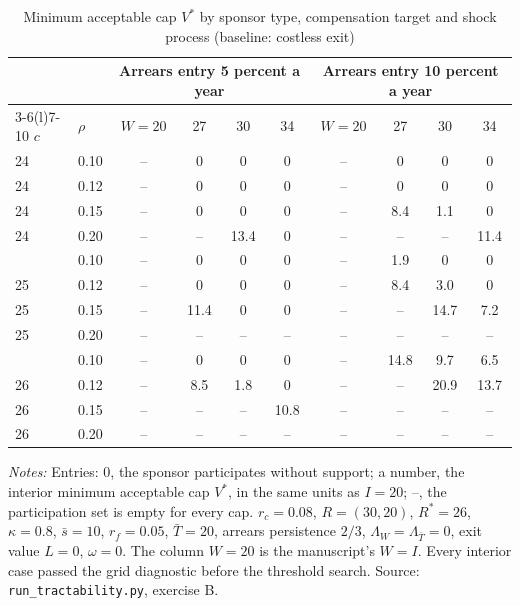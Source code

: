 \begin{table}[htbp]\centering\small
\caption{Minimum acceptable cap $V^*$ by sponsor type, compensation target and shock process (baseline: costless exit)}\label{tab:c1B}
\begin{threeparttable}\begin{tabular}{llcccccccc}\toprule
 & & \multicolumn{4}{c}{Arrears entry 5 percent a year} & \multicolumn{4}{c}{Arrears entry 10 percent a year}\\\cmidrule(lr){3-6}\cmidrule(l){7-10}
$c$ & $\rho$ & $W{=}20$ & 27 & 30 & 34 & $W{=}20$ & 27 & 30 & 34\\\midrule
24 & 0.10 & -- & 0 & 0 & 0 & -- & 0 & 0 & 0\\
24 & 0.12 & -- & 0 & 0 & 0 & -- & 0 & 0 & 0\\
24 & 0.15 & -- & 0 & 0 & 0 & -- & 8.4 & 1.1 & 0\\
24 & 0.20 & -- & -- & 13.4 & 0 & -- & -- & -- & 11.4\\
\addlinespace
25 & 0.10 & -- & 0 & 0 & 0 & -- & 1.9 & 0 & 0\\
25 & 0.12 & -- & 0 & 0 & 0 & -- & 8.4 & 3.0 & 0\\
25 & 0.15 & -- & 11.4 & 0 & 0 & -- & -- & 14.7 & 7.2\\
25 & 0.20 & -- & -- & -- & -- & -- & -- & -- & --\\
\addlinespace
26 & 0.10 & -- & 0 & 0 & 0 & -- & 14.8 & 9.7 & 6.5\\
26 & 0.12 & -- & 8.5 & 1.8 & 0 & -- & -- & 20.9 & 13.7\\
26 & 0.15 & -- & -- & -- & 10.8 & -- & -- & -- & --\\
26 & 0.20 & -- & -- & -- & -- & -- & -- & -- & --\\
\bottomrule\end{tabular}
\begin{tablenotes}\footnotesize\item \textit{Notes:} Entries: 0, the sponsor participates without support; a number, the interior minimum acceptable cap $V^*$, in the same units as $I = 20$; --, the participation set is empty for every cap. $r_c = 0.08$, $R = (30, 20)$, $R^* = 26$, $\kappa = 0.8$, $\bar s = 10$, $r_f = 0.05$, $\bar T = 20$, arrears persistence $2/3$, $\Lambda_W = \Lambda_{\bar T} = 0$, exit value $L = 0$, $\omega = 0$. The column $W = 20$ is the manuscript's $W = I$. Every interior case passed the grid diagnostic before the threshold search. Source: \texttt{run\_tractability.py}, exercise B.\end{tablenotes}
\end{threeparttable}\end{table}